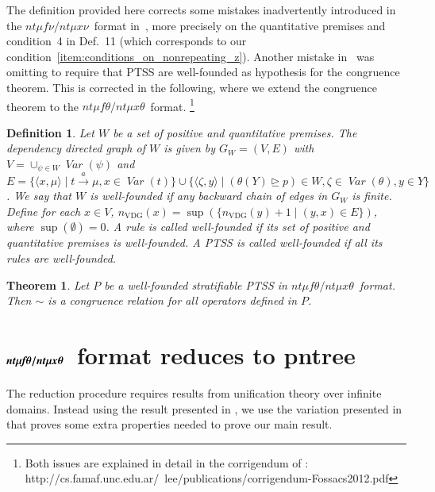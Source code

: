 \documentclass[submission,copyright,creativecommons]{eptcs}
\newtheorem{definition}{Definition}
\newtheorem{theorem}{Theorem}
\newcommand{\trans}[1][]{\xrightarrow{\, {#1} \, }}
\newcommand{\gtgeq}{\trianglerighteq}
\newcommand{\tuple}[1]{\langle{#1}\rangle}
\newcommand{\Var}{\mathop{\textit{Var}}}
\newcommand{\nvdg}{n_{\mathrm{VDG}}}
\newcommand{\ntmufnu}{\ensuremath{\textit{nt}\mu\textit{f}\nu}}
\newcommand{\ntmuxnu}{\ensuremath{\textit{nt}\mu\textit{x}\nu}}
\newcommand{\ntmufxnu}{\ensuremath{\ntmufnu\textit{/}\ntmuxnu}}
\newcommand{\ntmuft}{\ensuremath{\textit{nt}\mu\textit{f}\theta}}
\newcommand{\ntmuxt}{\ensuremath{\textit{nt}\mu\textit{x}\theta}}
\newcommand{\ntmufxt}{\ensuremath{\ntmuft\textit{/}\ntmuxt}}
\newcommand{\bntmuft}{\ensuremath{\textit{\bfseries nt}\boldmath\mu\textit{\bfseries f}\boldmath\theta}}
\newcommand{\bntmuxt}{\ensuremath{\textit{\bfseries nt}\boldmath\mu\textit{\bfseries x}\boldmath\theta}}
\newcommand{\bntmufxt}{\ensuremath{\bntmuft/\bntmuxt}}
\newcommand{\bisim}{\sim}
\begin{document}
The definition provided here corrects some mistakes inadvertently
introduced in the \ntmufxnu\ format in~\cite{DL-fossacs12}, more
precisely on the quantitative premises and condition~4 in Def.~11
(which corresponds to our
condition~\ref{item:conditions_on_nonrepeating_z}).
Another mistake in~\cite{DL-fossacs12} was omitting to require that
PTSS are well-founded as hypothesis for the congruence theorem.  This
is corrected in the following, where we extend the congruence theorem
to the \ntmufxt\ format.
\footnote{Both issues are explained in detail in the corrigendum of \cite{DL-fossacs12}:
http://cs.famaf.unc.edu.ar/~lee/publications/corrigendum-Fossacs2012.pdf}



\begin{definition}
 Let $W$ be a set of positive and quantitative premises.
 The \emph{dependency directed graph} of $W$ is given by $G_W = (V, E)$ with
 $V = \textstyle{\cup_{\psi \in W} \Var(\psi)}$ and
$E = \{\tuple{x, \mu} \mid t \trans[a] \mu, x \in \Var(t)\} \cup \{\tuple{\zeta, y} \mid (\theta(Y)\gtgeq p) \in W, \zeta \in \Var(\theta), y \in Y\}$.
We say that $W$ is \emph{well-founded} if any backward chain of edges in  $G_W$ is finite.
Define for each $x \in V$, $\nvdg(x) = \sup(\{\nvdg(y) + 1 \mid (y,x) \in E \})$,
 where $\sup(\emptyset) = 0$.   
A rule is called \emph{well-founded} if its set of positive and quantitative premises is well-founded. 
 A PTSS is called \emph{well-founded} if all its rules are well-founded. 
\end{definition}



\begin{theorem}\label{th:congruence}
 Let $P$ be a well-founded stratifiable PTSS in $\ntmufxt$\ format. Then $\bisim$ is a congruence relation for all operators defined in $P$.
\end{theorem}




\section{\bntmufxt\ format reduces to pntree}\label{sec:reduction_pntree}


The reduction procedure requires results from unification theory over infinite domains.  
Instead using the result presented in \cite{Fokkink1997183}, we use the 
variation presented in \cite[Lemma 3.2]{FokkinkvanGlabbeek96} that proves some extra
properties needed to prove our main result.
\end{document}
